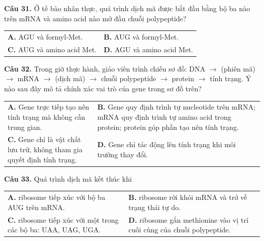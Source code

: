 \documentclass{article}
\begin{document}
\begin{minipage}[t][14.4cm][t]{\linewidth}
\fontsize{18}{23}\selectfont

\textbf{Câu 31.} Ở tế bào nhân thực, quá trình dịch mã được bắt đầu bằng bộ ba nào trên mRNA và amino acid nào mở đầu chuỗi polypeptide?\\[4pt]
\begin{tabularx}{\linewidth}{@{}X X@{}}
\textbf{A. } AGU và formyl-Met. & \textbf{B. } AUG và formyl-Met.\\[4pt]
\textbf{C. } AUG và amino acid Met. & \textbf{D. } AGU và amino acid Met.
\end{tabularx}
\vspace*{\fill}
\textbf{Câu 32.} Trong giờ thực hành, giáo viên trình chiếu sơ đồ: DNA $\rightarrow$ (phiên mã) $\rightarrow$ mRNA $\rightarrow$ (dịch mã) $\rightarrow$ chuỗi polypeptide $\rightarrow$ protein $\rightarrow$ tính trạng. Ý nào sau đây mô tả chính xác vai trò của gene trong sơ đồ trên?\\[4pt]
\begin{tabularx}{\linewidth}{@{}X X@{}}
\textbf{A. } Gene trực tiếp tạo nên tính trạng mà không cần trung gian. & \textbf{B. } Gene quy định trình tự nucleotide trên mRNA; mRNA quy định trình tự amino acid trong protein; protein góp phần tạo nên tính trạng.\\[4pt]
\textbf{C. } Gene chỉ là vật chất lưu trữ, không tham gia quyết định tính trạng. & \textbf{D. } Gene chỉ tác động lên tính trạng khi môi trường thay đổi.
\end{tabularx}

\end{minipage}
\newpage


\begin{minipage}[t][14.4cm][t]{\linewidth}
\fontsize{25}{33}\selectfont

\textbf{Câu 33.} Quá trình dịch mã kết thúc khi\\[4pt]
\begin{tabularx}{\linewidth}{@{}X X@{}}
\textbf{A. } ribosome tiếp xúc với bộ ba AUG trên mRNA. & \textbf{B. } ribosome rời khỏi mRNA và trở về trạng thái tự do.\\[4pt]
\textbf{C. } ribosome tiếp xúc với một trong các bộ ba: UAA, UAG, UGA. & \textbf{D. } ribosome gắn methionine vào vị trí cuối cùng của chuỗi polypeptide.
\end{tabularx}
\vspace*{\fill}

\end{minipage}
\newpage
\end{document}
